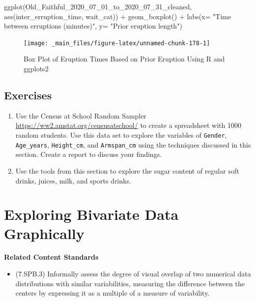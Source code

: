 \documentclass[
]{book}
\newenvironment{Shaded}{\begin{snugshade}}{\end{snugshade}}
\newcommand{\AttributeTok}[1]{\textcolor[rgb]{0.77,0.63,0.00}{#1}}
\newcommand{\FunctionTok}[1]{\textcolor[rgb]{0.00,0.00,0.00}{#1}}
\newcommand{\NormalTok}[1]{#1}
\newcommand{\SpecialCharTok}[1]{\textcolor[rgb]{0.00,0.00,0.00}{#1}}
\newcommand{\StringTok}[1]{\textcolor[rgb]{0.31,0.60,0.02}{#1}}
\providecommand{\tightlist}{%
  \setlength{\itemsep}{0pt}\setlength{\parskip}{0pt}}
\newenvironment{standards}{}{}
\theoremstyle{definition}
\theoremstyle{definition}
\theoremstyle{definition}
\theoremstyle{definition}
\theoremstyle{remark}
\begin{document}
\begin{Shaded}
\begin{Highlighting}[]
\FunctionTok{ggplot}\NormalTok{(Old\_Faithful\_2020\_07\_01\_to\_2020\_07\_31\_cleaned, }\FunctionTok{aes}\NormalTok{(inter\_erruption\_time, wait\_cat)) }\SpecialCharTok{+} \FunctionTok{geom\_boxplot}\NormalTok{() }\SpecialCharTok{+} \FunctionTok{labs}\NormalTok{(}\AttributeTok{x=} \StringTok{"Time between erruptions (minutes)"}\NormalTok{, }\AttributeTok{y=} \StringTok{"Prior eruption length"}\NormalTok{)}
\end{Highlighting}
\end{Shaded}

\begin{figure}

{\centering \texttt{[image: \_main\_files/figure-latex/unnamed-chunk-178-1]} 

}

\caption{Box Plot of Eruption Times Based on Prior Eruption Using R and ggplots2}\label{fig:unnamed-chunk-178}
\end{figure}

\hypertarget{exercises-60}{%
\subsection{Exercises}\label{exercises-60}}

\begin{enumerate}
\def\labelenumi{\arabic{enumi}.}
\item
  Use the Census at School Random Sampler \url{https://ww2.amstat.org/censusatschool/} to create a spreadsheet with 1000 random students. Use this data set to explore the variables of \texttt{Gender}, \texttt{Age\_years}, \texttt{Height\_cm}, and \texttt{Armspan\_cm} using the techniques discussed in this section. Create a report to discuss your findings.
\item
  Use the tools from this section to explore the sugar content of regular soft drinks, juices, milk, and sports drinks.
\end{enumerate}

\hypertarget{exploring-bivariate-data-graphically}{%
\section{Exploring Bivariate Data Graphically}\label{exploring-bivariate-data-graphically}}

\begin{standards}

\begin{center}
\textbf{Related Content Standards}

\end{center}

\begin{itemize}
\tightlist
\item
  (7.SPB.3) Informally assess the degree of visual overlap of two numerical data distributions with similar variabilities, measuring the difference between the centers by expressing it as a multiple of a measure of variability.
\end{itemize}

\end{standards}
\end{document}
